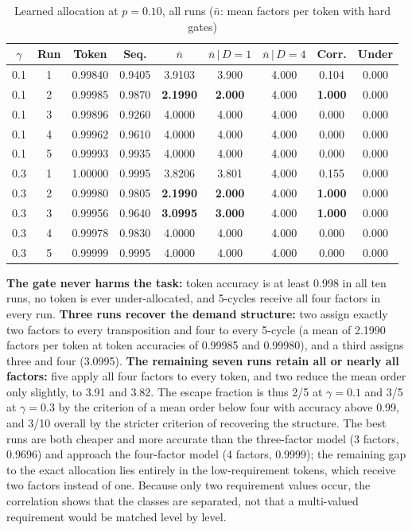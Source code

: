 \begin{table}[ht]
	\caption{Learned allocation at $p = 0.10$, all runs ($\bar n$: mean factors per token with hard gates)}
	\centering
	\small
	\begin{tabular}{c c c c c c c c c}
		\toprule
		$\gamma$ & \textbf{Run} & \textbf{Token} & \textbf{Seq.} & $\bar n$ & $\bar n\,|\,D{=}1$ & $\bar n\,|\,D{=}4$ & \textbf{Corr.} & \textbf{Under} \\
		\midrule
		0.1 & 1 & 0.99840 & 0.9405 & 3.9103 & 3.900 & 4.000 & 0.104 & 0.000 \\
		0.1 & 2 & 0.99985 & 0.9870 & \textbf{2.1990} & \textbf{2.000} & 4.000 & \textbf{1.000} & 0.000 \\
		0.1 & 3 & 0.99896 & 0.9260 & 4.0000 & 4.000 & 4.000 & 0.000 & 0.000 \\
		0.1 & 4 & 0.99962 & 0.9610 & 4.0000 & 4.000 & 4.000 & 0.000 & 0.000 \\
		0.1 & 5 & 0.99993 & 0.9935 & 4.0000 & 4.000 & 4.000 & 0.000 & 0.000 \\
		\midrule
		0.3 & 1 & 1.00000 & 0.9995 & 3.8206 & 3.801 & 4.000 & 0.155 & 0.000 \\
		0.3 & 2 & 0.99980 & 0.9805 & \textbf{2.1990} & \textbf{2.000} & 4.000 & \textbf{1.000} & 0.000 \\
		0.3 & 3 & 0.99956 & 0.9640 & \textbf{3.0995} & \textbf{3.000} & 4.000 & \textbf{1.000} & 0.000 \\
		0.3 & 4 & 0.99978 & 0.9830 & 4.0000 & 4.000 & 4.000 & 0.000 & 0.000 \\
		0.3 & 5 & 0.99999 & 0.9995 & 4.0000 & 4.000 & 4.000 & 0.000 & 0.000 \\
		\bottomrule
	\end{tabular}
	\label{tab:sweep}
\end{table}


\textbf{The gate never harms the task:} token accuracy is at least 0.998 in all ten runs, no token is ever under-allocated, and 5-cycles receive all four factors in every run. \textbf{Three runs recover the demand structure:} two assign exactly two factors to every transposition and four to every 5-cycle (a mean of 2.1990 factors per token at token accuracies of 0.99985 and 0.99980), and a third assigns three and four (3.0995). \textbf{The remaining seven runs retain all or nearly all factors:} five apply all four factors to every token, and two reduce the mean order only slightly, to 3.91 and 3.82. The escape fraction is thus 2/5 at $\gamma=0.1$ and 3/5 at $\gamma=0.3$ by the criterion of a mean order below four with accuracy above 0.99, and 3/10 overall by the stricter criterion of recovering the structure. The best runs are both cheaper and more accurate than the three-factor model (3 factors, 0.9696) and approach the four-factor model (4 factors, 0.9999); the remaining gap to the exact allocation lies entirely in the low-requirement tokens, which receive two factors instead of one. Because only two requirement values occur, the correlation shows that the classes are separated, not that a multi-valued requirement would be matched level by level.


